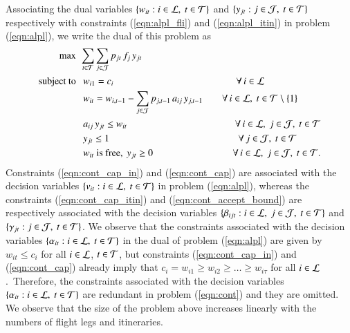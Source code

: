 Associating the dual variables $\{ w_{it} : i \in {\cal L},~ t \in {\cal T}\}$ and $\{ y_{jt} : j \in {\cal J},~ t \in {\cal T}\}$ respectively with constraints (\ref{eqn:alpl_fli}) and (\ref{eqn:alpl_itin}) in problem (\ref{eqn:alpl}), we write the dual of this problem as
%
%
\begin{subequations}
\label{eqn:cont}
\begin{align}
\max~~~ 
&
\!\! \sum_{t \in {\cal T}} \sum_{j \in {\cal J}}  p_{jt} {\,} f_j {\,} y_{jt}
\label{eqn:cont_obj}
\\
\mbox{subject to}~~~
&
w_{i1} = c_i 
\qquad \qquad \qquad \qquad \qquad \qquad ~~{\,} \forall {\,} i \in {\cal L}
\label{eqn:cont_cap_in}
\\
&
w_{it} = w_{i,t-1} - \sum_{j \in {\cal J}} p_{j,t-1} {\,} a_{ij} {\,} y_{j,t-1} 
\qquad \forall {\,} i \in {\cal L},~ t \in {\cal T} \setminus\{ 1\}
\label{eqn:cont_cap}
\\
& 
a_{ij} {\,} y_{jt} \leq w_{it} 
\qquad \qquad \qquad \qquad \qquad \quad {\,} \forall {\,} i \in {\cal L},~ j \in {\cal J},~t \in {\cal T}
\label{eqn:cont_cap_itin}
\\
&
y_{jt} \leq 1 
\qquad \qquad \qquad \qquad \qquad \qquad \quad {\,}{\,} \forall {\,}  j \in {\cal J},~ t \in {\cal T}
\label{eqn:cont_accept_bound}
\\
&
w_{it} \mbox{ is free},~ y_{jt} \geq 0 
\qquad \qquad \qquad \qquad ~  \forall {\,} i \in {\cal L},~j \in {\cal J},~ t \in {\cal T}.
\label{eqn:cont_e}
\end{align}
\end{subequations}
%
%
Constraints (\ref{eqn:cont_cap_in}) and (\ref{eqn:cont_cap}) are associated with the decision variables $\{ v_{it} : i \in {\cal L},~t \in {\cal T}\}$ in problem (\ref{eqn:alpl}), whereas the constraints (\ref{eqn:cont_cap_itin}) and (\ref{eqn:cont_accept_bound}) are respectively associated with the decision variables $\{ \beta_{ijt} : i \in {\cal L},~ j \in {\cal J},~ t \in {\cal T}\}$ and $\{ \gamma_{jt} : j \in {\cal J},~t \in {\cal T}\}$. We observe that the constraints associated with the decision variables $\{ \alpha_{it} : i \in {\cal L},~t \in {\cal T}\}$ in the dual of problem (\ref{eqn:alpl}) are given by $w_{it} \leq c_i$ for all $i \in {\cal L}$, $t \in {\cal T}$, but constraints (\ref{eqn:cont_cap_in}) and (\ref{eqn:cont_cap}) already imply that $c_i = w_{i1} \geq w_{i2} \geq \ldots \geq w_{i\tau}$ for all $i \in {\cal L}$.~Therefore, the constraints associated with the decision variables $\{ \alpha_{it} : i \in {\cal L},~t \in {\cal T}\}$ are redundant in problem (\ref{eqn:cont}) and they are omitted. We observe that the size of the problem above increases linearly with the numbers of flight legs and itineraries.



